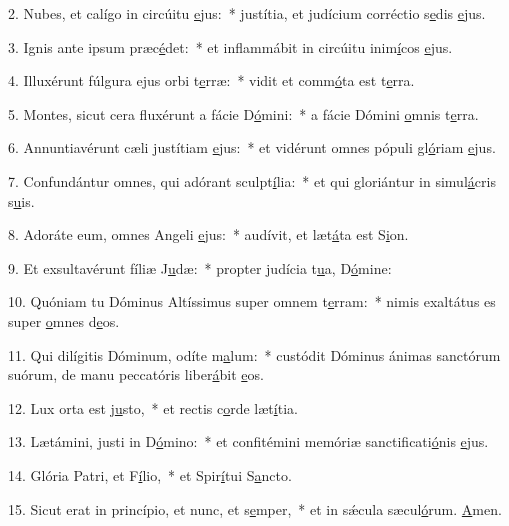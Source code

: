 2. Nubes, et calígo in circúitu \uline{e}jus:~* justítia, et judícium corréctio s\uline{e}dis \uline{e}jus.\par 
3. Ignis ante ipsum præc\uline{é}det:~* et inflammábit in circúitu inim\uline{í}cos \uline{e}jus.\par 
4. Illuxérunt fúlgura ejus orbi t\uline{e}rræ:~* vidit et comm\uline{ó}ta est t\uline{e}rra.\par 
5. Montes, sicut cera fluxérunt a fácie D\uline{ó}mini:~* a fácie Dómini \uline{o}mnis t\uline{e}rra.\par 
6. Annuntiavérunt cæli justítiam \uline{e}jus:~* et vidérunt omnes pópuli gl\uline{ó}riam \uline{e}jus.\par 
7. Confundántur omnes, qui adórant sculpt\uline{í}lia:~* et qui gloriántur in simul\uline{á}cris s\uline{u}is.\par 
8. Adoráte eum, omnes Angeli \uline{e}jus:~* audívit, et læt\uline{á}ta est S\uline{i}on.\par 
9. Et exsultavérunt fíliæ J\uline{u}dæ:~* propter judícia t\uline{u}a, D\uline{ó}mine:\par 
10. Quóniam tu Dóminus Altíssimus super omnem t\uline{e}rram:~* nimis exaltátus es super \uline{o}mnes d\uline{e}os.\par 
11. Qui dilígitis Dóminum, odíte m\uline{a}lum:~* custódit Dóminus ánimas sanctórum suórum, de manu peccatóris liber\uline{á}bit \uline{e}os.\par 
12. Lux orta est j\uline{u}sto,~* et rectis c\uline{o}rde læt\uline{í}tia.\par 
13. Lætámini, justi in D\uline{ó}mino:~* et confitémini memóriæ sanctificati\uline{ó}nis \uline{e}jus.\par 
14. Glória Patri, et F\uline{í}lio,~* et Spir\uline{í}tui S\uline{a}ncto.\par 
15. Sicut erat in princípio, et nunc, et s\uline{e}mper,~* et in sǽcula sæcul\uline{ó}rum. \uline{A}men.\par 
